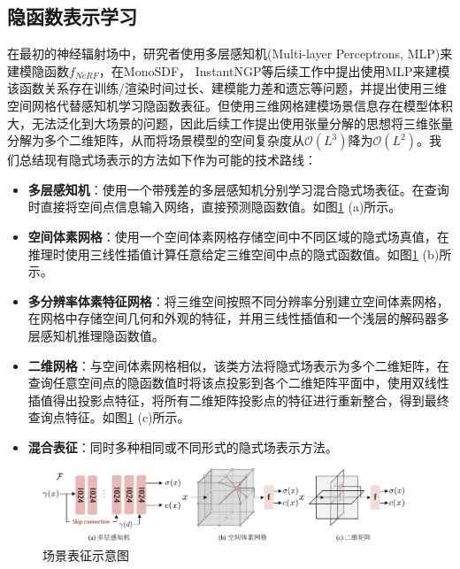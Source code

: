 \subsection{隐函数表示学习}
在最初的神经辐射场中，研究者使用多层感知机(Multi-layer Perceptrons, MLP)来建模隐函数$f_{NeRF}$，在MonoSDF\cite{yu_monosdf_2022}， InstantNGP\cite{muller_instant_2022}等后续工作中提出使用MLP来建模该函数关系存在训练/渲染时间过长、建模能力差和遗忘等问题，并提出使用三维空间网格代替感知机学习隐函数表征。但使用三维网格建模场景信息存在模型体积大，无法泛化到大场景的问题，因此后续工作\cite{chen_tensorf_2022, fridovich-keil_k-planes_2023, cao_hexplane_2023, reiser_merf_2023}提出使用张量分解\cite{kolda_tensor_2009}的思想将三维张量分解为多个二维矩阵，从而将场景模型的空间复杂度从$\mathcal O (L^3)$降为$\mathcal O (L^2)$。我们总结现有隐式场表示的方法如下作为可能的技术路线：
\begin{itemize}
    \item \textbf{多层感知机}：使用一个带残差的多层感知机分别学习混合隐式场表征。在查询时直接将空间点信息输入网络，直接预测隐函数值。如图\ref{fig:scene-representation} (a)所示。
    \item \textbf{空间体素网格}：使用一个空间体素网格存储空间中不同区域的隐式场真值，在推理时使用三线性插值计算任意给定三维空间中点的隐式函数值。如图\ref{fig:scene-representation} (b)所示。
    \item \textbf{多分辨率体素特征网格}：将三维空间按照不同分辨率分别建立空间体素网格，在网格中存储空间几何和外观的特征，并用三线性插值和一个浅层的解码器多层感知机推理隐函数值。
    \item \textbf{二维网格}：与空间体素网格相似，该类方法将隐式场表示为多个二维矩阵，在查询任意空间点的隐函数值时将该点投影到各个二维矩阵平面中，使用双线性插值得出投影点特征，将所有二维矩阵投影点的特征进行重新整合，得到最终查询点特征。如图\ref{fig:scene-representation} (c)所示。
    \item \textbf{混合表征}：同时多种相同或不同形式的隐式场表示方法。
\end{itemize}

\begin{figure}[t]
    \centering
    \includegraphics[width=\textwidth]{undergraduate-thesis/images/Scene Representations.pdf}
    \caption{场景表征示意图}
    \label{fig:scene-representation}
\end{figure}

